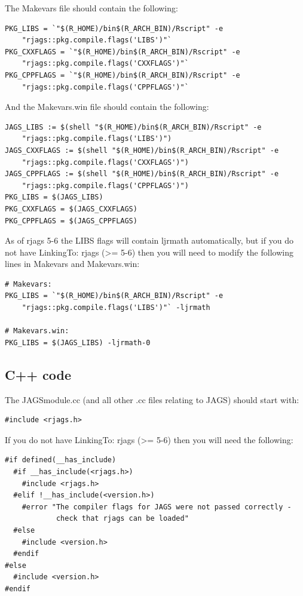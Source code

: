 \documentclass[11pt, a4paper, titlepage]{report}
\begin{document}
The Makevars file should contain the following:

\begin{verbatim}
PKG_LIBS = `"$(R_HOME)/bin$(R_ARCH_BIN)/Rscript" -e 
	"rjags::pkg.compile.flags('LIBS')"`
PKG_CXXFLAGS = `"$(R_HOME)/bin$(R_ARCH_BIN)/Rscript" -e 
	"rjags::pkg.compile.flags('CXXFLAGS')"`
PKG_CPPFLAGS = `"$(R_HOME)/bin$(R_ARCH_BIN)/Rscript" -e 
	"rjags::pkg.compile.flags('CPPFLAGS')"`
\end{verbatim}

And the Makevars.win file should contain the following:

\begin{verbatim}
JAGS_LIBS := $(shell "$(R_HOME)/bin$(R_ARCH_BIN)/Rscript" -e 
	"rjags::pkg.compile.flags('LIBS')")
JAGS_CXXFLAGS := $(shell "$(R_HOME)/bin$(R_ARCH_BIN)/Rscript" -e
	"rjags::pkg.compile.flags('CXXFLAGS')")
JAGS_CPPFLAGS := $(shell "$(R_HOME)/bin$(R_ARCH_BIN)/Rscript" -e
	"rjags::pkg.compile.flags('CPPFLAGS')")
PKG_LIBS = $(JAGS_LIBS)
PKG_CXXFLAGS = $(JAGS_CXXFLAGS)
PKG_CPPFLAGS = $(JAGS_CPPFLAGS)
\end{verbatim}

As of rjags 5-6 the LIBS flags will contain ljrmath automatically, but
if you do not have LinkingTo:  rjags (>= 5-6) then you will need to modify
the following lines in Makevars and Makevars.win:

\begin{verbatim}
# Makevars:
PKG_LIBS = `"$(R_HOME)/bin$(R_ARCH_BIN)/Rscript" -e
	"rjags::pkg.compile.flags('LIBS')"` -ljrmath

# Makevars.win:
PKG_LIBS = $(JAGS_LIBS) -ljrmath-0
\end{verbatim}

\subsection{C++ code}

The JAGSmodule.cc (and all other .cc files relating to JAGS) should start
with:

\begin{verbatim}
#include <rjags.h>
\end{verbatim}

If you do not have LinkingTo:  rjags (>= 5-6) then you will need the following:

\begin{verbatim}
#if defined(__has_include)
  #if __has_include(<rjags.h>)
    #include <rjags.h>
  #elif !__has_include(<version.h>)
    #error "The compiler flags for JAGS were not passed correctly - 
    		check that rjags can be loaded"
  #else
    #include <version.h>
  #endif
#else
  #include <version.h>
#endif
\end{verbatim}
\end{document}
